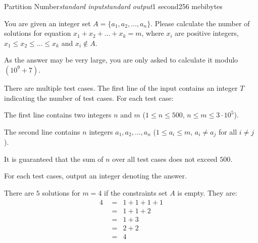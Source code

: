 \begin{problem}{Partition Number}{\textsl{standard input}}{\textsl{standard output}}{1 second}{256 mebibytes}

You are given an integer set $A=\{a_1,a_2,\ldots,a_n\}$. Please calculate the number of solutions for equation $x_1+x_2+\ldots+x_k=m$, where $x_i$ are positive integers, $x_1 \le x_2 \le \ldots \le x_k$ and $x_i \not \in A$.

As the answer may be very large, you are only asked to calculate it modulo $(10^9 + 7)$.

\InputFile
There are multiple test cases. The first line of the input contains an integer $T$ indicating the number of test cases. For each test case:

The first line contains two integers $n$ and $m$ ($1 \le n \le 500$, $n \le m \le 3 \cdot 10^5$).

The second line contains $n$ integers $a_1,a_2,\ldots,a_n$ ($1 \le a_i \le m$, $a_i \ne a_j$ for all $i \ne j$).

It is guaranteed that the sum of $n$ over all test cases does not exceed $500$.


\OutputFile
For each test cases, output an integer denoting the answer.




\Example

\begin{example}
%
\end{example}

\Note
There are $5$ solutions for $m=4$ if the constraints set $A$ is empty. They are:
$$
\begin{aligned}
4~~& = & 1+1+1+1 \\
{} & = & 1+1+2 \\
{} & = & 1+3 \\
{} & = & 2+2 \\
{} & = & 4
\end{aligned}
$$

\end{problem}
